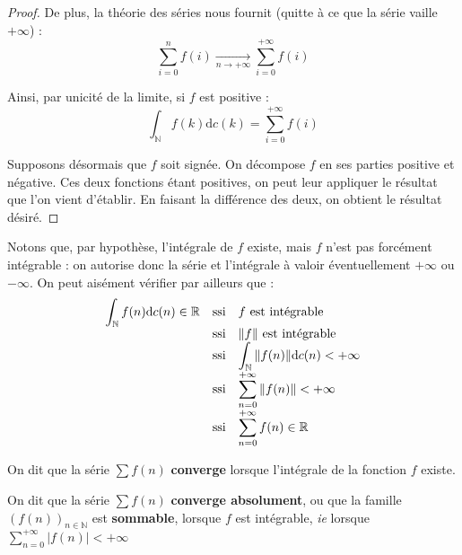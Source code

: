 \documentclass[../integ-proba.tex]{subfiles}
\begin{document}
\begin{proof}
        De plus, la théorie des séries nous fournit (quitte à ce que la série vaille $+\infty$) :
        \begin{displaymath}
            \sum_{i=0}^n f(i) \xrightarrow[n \to + \infty]{} \sum_{i=0}^{+\infty} f(i)
        \end{displaymath}

        Ainsi, par unicité de la limite, si $f$ est positive :
        \begin{displaymath}
            \int_\mathbb{N} f(k)\text{d}c(k) = \sum_{i=0}^{+\infty} f(i)
        \end{displaymath}

        Supposons désormais que $f$ soit signée.
        On décompose $f$ en ses parties positive et négative.
        Ces deux fonctions étant positives, on peut leur appliquer le résultat que l'on vient d'établir.
        En faisant la différence des deux, on obtient le résultat désiré.
    \end{proof}

    \begin{rem}
        Notons que, par hypothèse, l'intégrale de $f$ existe, mais $f$ n'est pas forcément intégrable : on autorise donc la série et l'intégrale à valoir éventuellement $+\infty$ ou $-\infty$.
        On peut aisément vérifier par ailleurs que :
        \begin{displaymath}
            {
        \everymath={\displaystyle}
        \begin{array}{rcl}
            \int_\mathbb{N} f(n) \text{d} c(n) \in \mathbb{R} & \text{ssi} & f \text{ est intégrable } \\
                                                              & \text{ssi} & \|f\| \text{ est intégrable} \\
                                                              & \text{ssi} & \int_\mathbb{N} \|f(n)\| \text{d} c(n) < + \infty \\
                                                              & \text{ssi} & \sum_{n=0}^{+ \infty} \|f(n)\| < + \infty \\
                                                              & \text{ssi} & \sum_{n=0}^{+ \infty} f(n) \in \mathbb{R}
        \end{array}
        }
        \end{displaymath}
    \end{rem}

    \begin{defi}
        On dit que la série $\sum f(n)$ \textbf{converge} lorsque l'intégrale de la fonction $f$ existe.

        On dit que la série $\sum f(n)$ \textbf{converge absolument}, ou que la famille $\left(f(n)\right)_{n \in \mathbb{N}}$ est \textbf{sommable}, lorsque $f$ est intégrable, \textit{ie} lorsque $\sum_{n=0}^{+ \infty} \left|f(n)\right| < + \infty$
    \end{defi}
\end{document}
